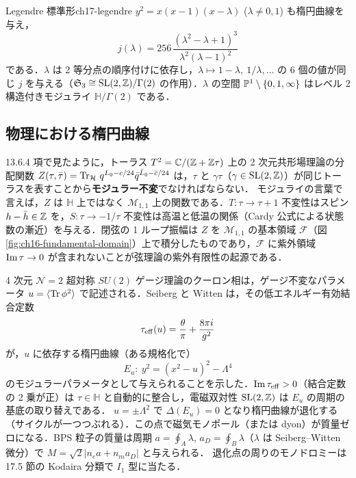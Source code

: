 \begin{myex}{Legendre 標準形}{ch17-legendre}
$y^2=x(x-1)(x-\lambda)$ ($\lambda\ne0,1$) も楕円曲線を与え，
\[
j(\lambda)=256\,\frac{(\lambda^2-\lambda+1)^3}{\lambda^2(\lambda-1)^2}
\]
である．$\lambda$ は 2 等分点の順序付けに依存し，$\lambda\mapsto 1-\lambda,\ 1/\lambda,\dots$ の 6 個の値が同じ $j$ を与える（$\mathfrak{S}_3\cong\operatorname{SL}(2,\mathbb{Z})/\Gamma(2)$ の作用）．$\lambda$ の空間 $\mathbb{P}^1\setminus\{0,1,\infty\}$ はレベル 2 構造付きモジュライ $\mathbb{H}/\Gamma(2)$ である．
\end{myex}

\subsection{物理における楕円曲線}

\begin{physbox}
13.6.4 項で見たように，トーラス $T^2=\mathbb{C}/(\mathbb{Z}+\mathbb{Z}\tau)$ 上の 2 次元共形場理論の分配関数 $Z(\tau,\bar\tau)=\operatorname{Tr}_{\mathcal{H}}\,q^{L_0-c/24}\bar q^{\bar L_0-\bar c/24}$ は，$\tau$ と $\gamma\tau$（$\gamma\in\operatorname{SL}(2,\mathbb{Z})$）が同じトーラスを表すことから\textbf{モジュラー不変}でなければならない．
モジュライの言葉で言えば，$Z$ は $\mathbb{H}$ 上ではなく $\mathcal{M}_{1,1}$ 上の関数である．$T:\tau\to\tau+1$ 不変性はスピン $h-\bar h\in\mathbb{Z}$ を，$S:\tau\to-1/\tau$ 不変性は高温と低温の関係（Cardy 公式による状態数の漸近）を与える．閉弦の 1 ループ振幅は $Z$ を $\mathcal{M}_{1,1}$ の基本領域 $\mathcal{F}$（図 \ref{fig:ch16-fundamental-domain}）上で積分したものであり，$\mathcal{F}$ に紫外領域 $\operatorname{Im}\tau\to0$ が含まれないことが弦理論の紫外有限性の起源である．
\end{physbox}

\begin{physbox}
4 次元 $\mathcal{N}=2$ 超対称 $SU(2)$ ゲージ理論のクーロン相は，ゲージ不変なパラメータ $u=\langle\operatorname{Tr}\phi^2\rangle$ で記述される．Seiberg と Witten は，その低エネルギー有効結合定数
\[
\tau_{\rm eff}(u)=\frac{\theta}{\pi}+\frac{8\pi i}{g^2}
\]
が，$u$ に依存する楕円曲線（ある規格化で）
\[
E_u:\ y^2=(x^2-u)^2-\Lambda^4
\]
のモジュラーパラメータとして与えられることを示した．$\operatorname{Im}\tau_{\rm eff}>0$（結合定数の 2 乗が正）は $\tau\in\mathbb{H}$ と自動的に整合し，電磁双対性 $\operatorname{SL}(2,\mathbb{Z})$ は $E_u$ の周期の基底の取り替えである．
$u=\pm\Lambda^2$ で $\Delta(E_u)=0$ となり楕円曲線が退化する（サイクルが一つつぶれる）．この点で磁気モノポール（または dyon）が質量ゼロになる．BPS 粒子の質量は周期 $a=\oint_A\lambda$, $a_D=\oint_B\lambda$（$\lambda$ は Seiberg--Witten 微分）で $M=\sqrt2|n_ea+n_ma_D|$ と与えられる．
退化点の周りのモノドロミーは 17.5 節の Kodaira 分類で $I_1$ 型に当たる．
\end{physbox}

